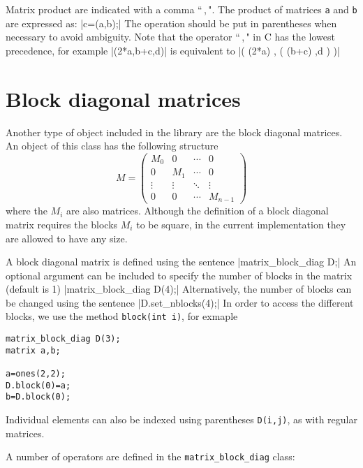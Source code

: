 \pagebreak

Matrix product are indicated with a comma ``\,,\,". The product of matrices {\tt a} and {\tt b} 
are expressed as:
|c=(a,b);|
The operation should be put in parentheses when necessary to avoid ambiguity. Note that the operator
``\,,\," in C has the lowest precedence, for example 
|(2*a,b+c,d)|
is equivalent to
|( (2*a) , ( (b+c) ,d ) )|

\section{Block diagonal matrices}

Another type of object included in the library are the block diagonal matrices. An object of this class
has the following structure
$$M=\left(
\begin{array}{cccc}
M_0&0&\cdots&0\\
0&M_1&\cdots&0\\
\vdots&\vdots&\ddots&\vdots\\
0&0&\cdots&M_{n-1}
\end{array}
\right)$$
where the $M_i$ are also matrices. Although the definition of a block diagonal matrix requires the blocks
$M_i$ to be square, in the current implementation they are allowed to have any size.

A block diagonal matrix is defined using the sentence
|matrix_block_diag D;|
An optional argument can be included to specify the number of blocks in the matrix (default is 1)
|matrix_block_diag D(4);|
Alternatively, the number of blocks can be changed using the sentence
|D.set_nblocks(4);|
In order to access the different blocks, we use the method \verb|block(int i)|, for exmaple
\begin{verbatim}
matrix_block_diag D(3);
matrix a,b;

a=ones(2,2);
D.block(0)=a;
b=D.block(0);
\end{verbatim}

Individual elements can also be indexed using parentheses \verb|D(i,j)|, as with regular matrices.

A number of operators are defined in the \verb|matrix_block_diag| class:

\medskip

